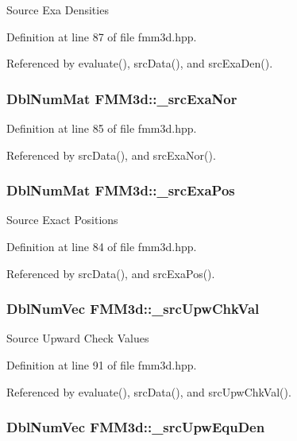 Source Exa Densities 

Definition at line 87 of file fmm3d.hpp.

Referenced by evaluate(), src\-Data(), and src\-Exa\-Den().
\subsubsection{\setlength{\rightskip}{0pt plus 5cm}Dbl\-Num\-Mat {\bf FMM3d::\_\-src\-Exa\-Nor}\hspace{0.3cm}{\tt  [protected]}}\label{classFMM3d_22d7ce06ed2a46c0ead29eb8cf978e73_22d7ce06ed2a46c0ead29eb8cf978e73}




Definition at line 85 of file fmm3d.hpp.

Referenced by src\-Data(), and src\-Exa\-Nor().
\subsubsection{\setlength{\rightskip}{0pt plus 5cm}Dbl\-Num\-Mat {\bf FMM3d::\_\-src\-Exa\-Pos}\hspace{0.3cm}{\tt  [protected]}}\label{classFMM3d_eae44947837c90b2b16cd71d430d120a_eae44947837c90b2b16cd71d430d120a}


Source Exact Positions 

Definition at line 84 of file fmm3d.hpp.

Referenced by src\-Data(), and src\-Exa\-Pos().
\subsubsection{\setlength{\rightskip}{0pt plus 5cm}Dbl\-Num\-Vec {\bf FMM3d::\_\-src\-Upw\-Chk\-Val}\hspace{0.3cm}{\tt  [protected]}}\label{classFMM3d_66ba408a04f406497ee360bb547afbbd_66ba408a04f406497ee360bb547afbbd}


Source Upward Check Values 

Definition at line 91 of file fmm3d.hpp.

Referenced by evaluate(), src\-Data(), and src\-Upw\-Chk\-Val().
\subsubsection{\setlength{\rightskip}{0pt plus 5cm}Dbl\-Num\-Vec {\bf FMM3d::\_\-src\-Upw\-Equ\-Den}\hspace{0.3cm}{\tt  [protected]}}\label{classFMM3d_43d7b35b741f178016ab9493125a58dc_43d7b35b741f178016ab9493125a58dc}


